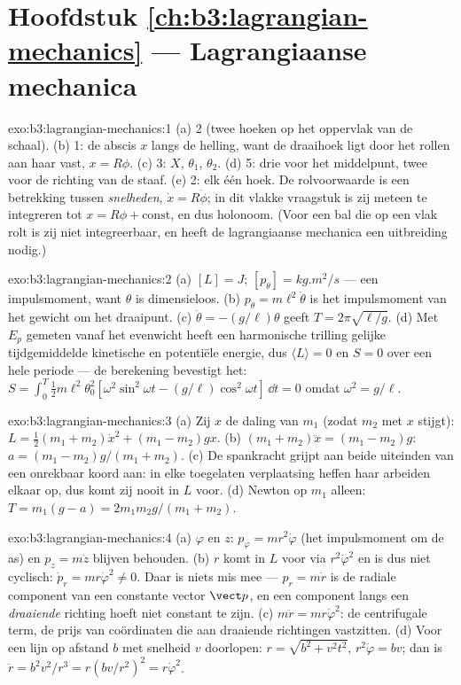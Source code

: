 \section*{Hoofdstuk \ref{ch:b3:lagrangian-mechanics} --- Lagrangiaanse mechanica}

\begin{solution}{exo:b3:lagrangian-mechanics:1}
(a) 2 (twee hoeken op het oppervlak van de schaal). (b) 1: de abscis $x$
langs de helling, want de draaihoek ligt door het rollen aan haar vast,
$x =
R\phi$. (c) 3: $X$, $\theta_1$, $\theta_2$. (d) 5: drie voor het
middelpunt, twee voor de richting van de staaf. (e) 2: elk één hoek. De
rolvoorwaarde is een betrekking tussen \emph{snelheden}, $\dot x =
R\dot\phi$; in dit vlakke vraagstuk is zij meteen te integreren tot $x = R\phi +
\text{const}$, en dus holonoom. (Voor een bal die op een vlak
rolt is zij niet integreerbaar, en heeft de lagrangiaanse mechanica een
uitbreiding nodig.)
\end{solution}

\begin{solution}{exo:b3:lagrangian-mechanics:2}
(a) $[L] = \unit{J}$; $[p_\theta] = \unit{kg.m^2/s}$ --- een
impulsmoment, want $\theta$ is dimensieloos. (b) $p_\theta =
m\ell^2\dot\theta$ is het impulsmoment van het gewicht om het draaipunt.
(c) $\ddot\theta = -(g/\ell)\theta$ geeft $T = 2\pi\sqrt{\ell/g}$. (d)
Met $E_p$ gemeten vanaf het evenwicht heeft een harmonische trilling
gelijke tijdgemiddelde kinetische en potentiële energie, dus $\langle
L\rangle = 0$ en $S = 0$ over een hele periode --- de berekening
bevestigt het: $S = \int_0^T\tfrac12 m\ell^2\theta_0^2[\omega^2\sin^2
\omega t - (g/\ell)\cos^2\omega t]\,\dd t = 0$ omdat $\omega^2 =
g/\ell$.
\end{solution}

\begin{solution}{exo:b3:lagrangian-mechanics:3}
(a) Zij $x$ de daling van $m_1$ (zodat $m_2$ met $x$ stijgt): $L =
\tfrac12(m_1 + m_2)\dot x^2 + (m_1 - m_2)gx$. (b) $(m_1 + m_2)\ddot x =
(m_1 - m_2)g$: $a = (m_1 - m_2)g/(m_1 + m_2)$. (c) De spankracht grijpt
aan beide uiteinden van een onrekbaar koord aan: in elke toegelaten
verplaatsing heffen haar arbeiden elkaar op, dus komt zij nooit in $L$
voor. (d) Newton op $m_1$ alleen: $T =
m_1(g - a) = 2m_1m_2g/(m_1 + m_2)$.
\end{solution}

\begin{solution}{exo:b3:lagrangian-mechanics:4}
(a) $\varphi$ en $z$: $p_\varphi = mr^2\dot\varphi$ (het impulsmoment om
de as) en $p_z = m\dot z$ blijven behouden. (b) $r$ komt in $L$ voor via
$r^2\dot\varphi^2$ en is dus niet cyclisch: $\dot p_r =
mr\dot\varphi^2 \neq 0$. Daar is niets mis mee --- $p_r = m\dot r$ is de
radiale component van een constante vector $\vect p$, en een component
langs een \emph{draaiende} richting hoeft niet constant te zijn. (c)
$m\ddot r =
mr\dot\varphi^2$: de centrifugale term, de prijs van
coördinaten die aan draaiende richtingen vastzitten. (d) Voor een lijn
op afstand $b$ met snelheid $v$ doorlopen: $r = \sqrt{b^2 + v^2t^2}$,
$r^2\dot\varphi = bv$; dan is $\ddot r = b^2v^2/r^3 = r(bv/r^2)^2 = r\dot\varphi^2$.
\end{solution}

